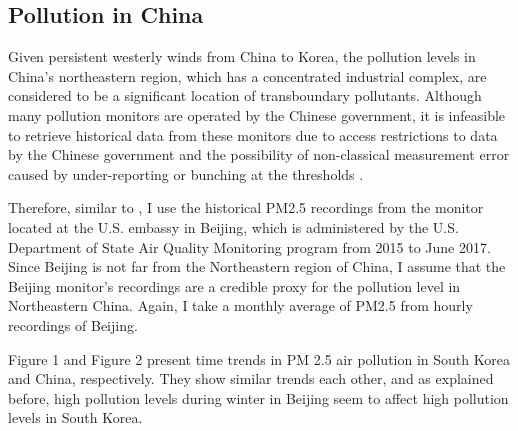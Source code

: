 \documentclass{article}
\begin{document}
\subsection{Pollution in China}
Given persistent westerly winds from China to Korea, the pollution levels in China's northeastern region, which has a concentrated industrial complex, are considered to be a significant location of transboundary pollutants. Although many pollution monitors are operated by the Chinese government, it is infeasible to retrieve historical data from these monitors due to access restrictions to data by the Chinese government and the possibility of non-classical measurement error caused by under-reporting or bunching at the thresholds \parencite{chen2012gaming,ghanem2014effortless}.

Therefore, similar to \textcite{jung2022transboundary}, I use the historical PM2.5 recordings from the monitor located at the U.S. embassy in Beijing, which is administered by the U.S. Department of State Air Quality Monitoring program from 2015 to June 2017. Since Beijing is not far from the Northeastern region of China, I assume that the Beijing monitor’s recordings are a credible proxy for the pollution level in Northeastern China. Again, I take a monthly average of PM2.5 from hourly recordings of Beijing. 

Figure 1 and Figure 2 present time trends in PM 2.5 air pollution in South Korea and China, respectively. They show similar trends each other, and as explained before, high pollution levels during winter in Beijing seem to affect high pollution levels in South Korea.
\end{document}

